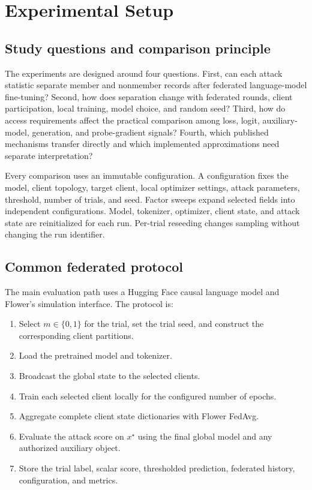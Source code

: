 \documentclass[11pt]{article}
\begin{document}
\section{Experimental Setup}

\subsection{Study questions and comparison principle}

The experiments are designed around four questions. First, can each attack statistic separate member and nonmember records after federated language-model fine-tuning? Second, how does separation change with federated rounds, client participation, local training, model choice, and random seed? Third, how do access requirements affect the practical comparison among loss, logit, auxiliary-model, generation, and probe-gradient signals? Fourth, which published mechanisms transfer directly and which implemented approximations need separate interpretation?

Every comparison uses an immutable configuration. A configuration fixes the model, client topology, target client, local optimizer settings, attack parameters, threshold, number of trials, and seed. Factor sweeps expand selected fields into independent configurations. Model, tokenizer, optimizer, client state, and attack state are reinitialized for each run. Per-trial reseeding changes sampling without changing the run identifier.

\subsection{Common federated protocol}

The main evaluation path uses a Hugging Face causal language model and Flower's simulation interface. The protocol is:
\begin{enumerate}
    \item Select $m\in\{0,1\}$ for the trial, set the trial seed, and construct the corresponding client partitions.
    \item Load the pretrained model and tokenizer.
    \item Broadcast the global state to the selected clients.
    \item Train each selected client locally for the configured number of epochs.
    \item Aggregate complete client state dictionaries with Flower FedAvg.
    \item Evaluate the attack score on $x^\star$ using the final global model and any authorized auxiliary object.
    \item Store the trial label, scalar score, thresholded prediction, federated history, configuration, and metrics.
\end{enumerate}
\end{document}
